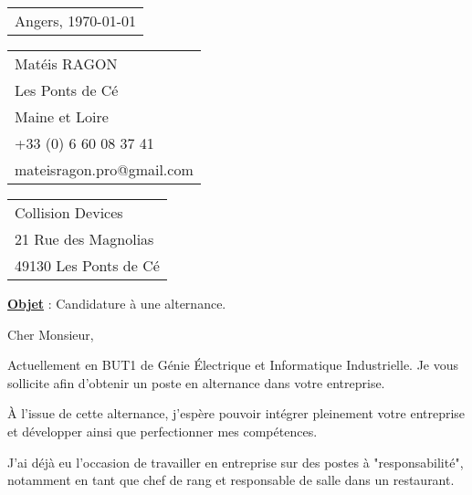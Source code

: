 \documentclass[french]{article}
\begin{document}

\hfill
\begin{tabular}{@{} l}
	\bigskip Angers, \today \\ %
\end{tabular}


\begin{tabular}{l @{}}
	Matéis RAGON \\ 
	Les Ponts de Cé \\
	Maine et Loire \\ %
	+33 (0) 6 60 08 37 41 \\
	mateisragon.pro@gmail.com
\end{tabular}

\hfill
\begin{tabular}{@{} l}
	Collision Devices \\
	21 Rue des Magnolias \\
	49130 Les Ponts de Cé
\end{tabular}

\bigskip %

\textbf{\underline{Objet}} :  Candidature à une alternance.


\bigskip %

Cher Monsieur,


Actuellement en BUT1 de Génie Électrique et Informatique Industrielle. Je vous sollicite afin d'obtenir un poste en alternance dans votre entreprise.

À l'issue de cette alternance, j'espère pouvoir intégrer pleinement votre entreprise et développer ainsi que perfectionner mes compétences.

J'ai déjà eu l'occasion de travailler en entreprise sur des postes à "responsabilité", notamment en tant que chef de rang et responsable de salle dans un restaurant.
\end{document}
